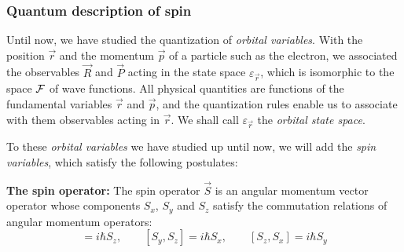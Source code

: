 \subsubsection{Quantum description of spin}

Until now, we have studied the quantization of \textit{orbital variables}. With the position $\vec{r}$ and the momentum $\vec{p}$ of a particle such as the electron, we associated the observables $\vec{R}$ and $\vec{P}$ acting in the state space $\varepsilon_{\vec{r}}$, which is isomorphic to the space $\mathcal{F}$ of wave functions. All physical quantities are functions of the fundamental variables $\vec{r}$ and $\vec{p}$, and the quantization rules enable us to associate with them observables acting in $\vec{r}$. We shall call $\varepsilon_{\vec{r}}$ the \textit{orbital state space}.

To these \textit{orbital variables} we have studied up until now, we will add the \textit{spin variables}, which satisfy the following postulates:

\begin{postulate}
    \textbf{The spin operator:} The spin operator $\vec{S}$ is an angular momentum vector operator whose components $S_x$, $S_y$ and $S_z$ satisfy the commutation relations of angular momentum operators:
    \begin{equation}
        [S_x, S_y] = i\hbar S_z, \qquad [S_y, S_z] = i\hbar S_x, \qquad [S_z, S_x] = i\hbar S_y
    \end{equation}
\end{postulate}

